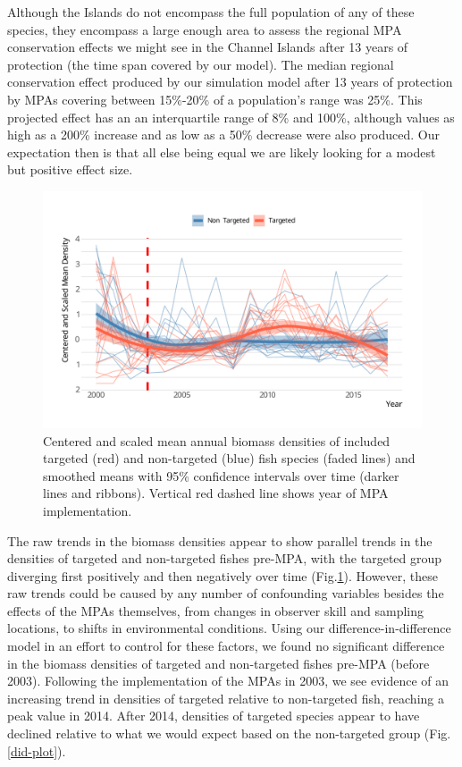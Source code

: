 \documentclass[9pt,twocolumn,twoside,lineno]{pnas-new}
\begin{document}
Although the Islands do not encompass the full population of any of
these species, they encompass a large enough area to assess the regional
MPA conservation effects we might see in the Channel Islands after 13
years of protection (the time span covered by our model). The median
regional conservation effect produced by our simulation model after 13
years of protection by MPAs covering between 15\%-20\% of a population's
range was 25\%. This projected effect has an an interquartile range of
8\% and 100\%, although values as high as a 200\% increase and as low as
a 50\% decrease were also produced. Our expectation then is that all
else being equal we are likely looking for a modest but positive effect
size.

\begin{figure}%
  \centering
  \includegraphics[width=1\linewidth]{figs/pop-trends.pdf}
  \caption{Centered and scaled mean annual biomass densities of included targeted (red) and non-targeted (blue) fish species (faded lines) and smoothed means with 95\% confidence intervals over time (darker lines and ribbons). Vertical red dashed line shows year of MPA implementation.}
  \label{pop-trends}
\end{figure}

The raw trends in the biomass densities appear to show parallel trends
in the densities of targeted and non-targeted fishes pre-MPA, with the
targeted group diverging first positively and then negatively over time
(Fig.\ref{pop-trends}). However, these raw trends could be caused by any
number of confounding variables besides the effects of the MPAs
themselves, from changes in observer skill and sampling locations, to
shifts in environmental conditions. Using our difference-in-difference
model in an effort to control for these factors, we found no significant
difference in the biomass densities of targeted and non-targeted fishes
pre-MPA (before 2003). Following the implementation of the MPAs in 2003,
we see evidence of an increasing trend in densities of targeted relative
to non-targeted fish, reaching a peak value in 2014. After 2014,
densities of targeted species appear to have declined relative to what
we would expect based on the non-targeted group (Fig.\ref{did-plot}).
\end{document}
